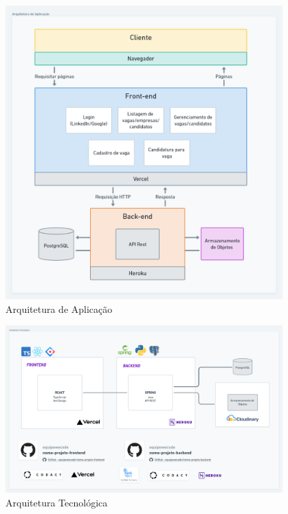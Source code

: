 \begin{figure}[H]
	\centering
	\caption{\label{fig-arq-app}Arquitetura de Aplicação}
	\includegraphics[width=0.95\textwidth]{imagens/arq-proj-arq-app2.png}
\end{figure}

\begin{figure}[H]
	\centering
	\caption{\label{fig-arq-tec}Arquitetura Tecnológica}
	\includegraphics[width=0.95\textwidth]{imagens/arq-proj-arq-tec2.png}
\end{figure}

